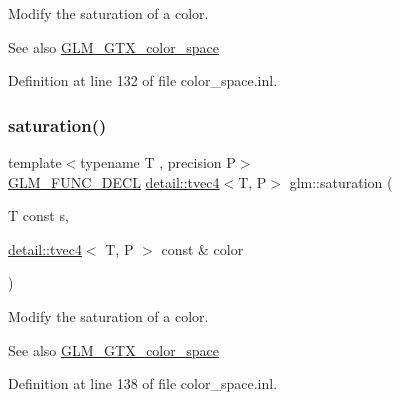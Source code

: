 Modify the saturation of a color. \begin{DoxySeeAlso}{See also}
\hyperlink{group__gtx__color__space}{G\+L\+M\+\_\+\+G\+T\+X\+\_\+color\+\_\+space} 
\end{DoxySeeAlso}


Definition at line 132 of file color\+\_\+space.\+inl.

\mbox{\label{group__gtx__color__space_ga42cc34c45ab66e010c629106952c8bdd}} 
\subsubsection{\texorpdfstring{saturation()}{saturation()}\hspace{0.1cm}{\footnotesize\ttfamily [3/3]}}
{\footnotesize\ttfamily template$<$typename T , precision P$>$ \\
\hyperlink{setup_8hpp_ab2d052de21a70539923e9bcbf6e83a51}{G\+L\+M\+\_\+\+F\+U\+N\+C\+\_\+\+D\+E\+CL} \hyperlink{structglm_1_1detail_1_1tvec4}{detail\+::tvec4}$<$T, P$>$ glm\+::saturation (\begin{DoxyParamCaption}\item[{T const}]{s,  }\item[{\hyperlink{structglm_1_1detail_1_1tvec4}{detail\+::tvec4}$<$ T, P $>$ const \&}]{color }\end{DoxyParamCaption})}

Modify the saturation of a color. \begin{DoxySeeAlso}{See also}
\hyperlink{group__gtx__color__space}{G\+L\+M\+\_\+\+G\+T\+X\+\_\+color\+\_\+space} 
\end{DoxySeeAlso}


Definition at line 138 of file color\+\_\+space.\+inl.

